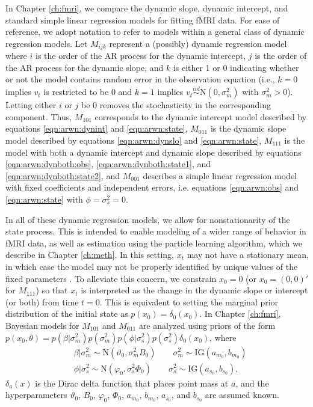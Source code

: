 In Chapter \ref{ch:fmri}, we compare the dynamic slope, dynamic intercept, and standard simple linear regression models for fitting fMRI data. For ease of reference, we adopt notation to refer to models within a general class of dynamic regression models. Let $M_{ijk}$ represent a (possibly) dynamic regression model where $i$ is the order of the AR process for the dynamic intercept, $j$ is the order of the AR process for the dynamic slope, and $k$ is either 1 or 0 indicating whether or not the model contains random error in the observation equation (i.e., $k = 0$ implies $v_t$ is restricted to be 0 and $k = 1$ implies $v_t \stackrel{iid}{\sim} \mbox{N}(0,\sigma^2_m)$ with $\sigma^2_m > 0$). Letting either $i$ or $j$ be 0 removes the stochasticity in the corresponding component. Thus, $M_{101}$ corresponds to the dynamic intercept model described by equations \ref{eqn:arwn:dynint} and \ref{eqn:arwn:state}, $M_{011}$ is the dynamic slope model described by equations \ref{eqn:arwn:dynslo} and \ref{eqn:arwn:state}, $M_{111}$ is the model with both a dynamic intercept and dynamic slope described by equations \ref{eqn:arwn:dynboth:obs}, \ref{eqn:arwn:dynboth:state1}, and \ref{eqn:arwn:dynboth:state2}, and $M_{001}$ describes a simple linear regression model with fixed coefficients and independent errors, i.e. equations \eqref{eqn:arwn:obs} and \eqref{eqn:arwn:state} with $\phi = \sigma^2_s = 0$.

In all of these dynamic regression models, we allow for nonstationarity of the state process. This is intended to enable modeling of a wider range of behavior in fMRI data, as well as estimation using the particle learning algorithm, which we describe in Chapter \ref{ch:meth}. In this setting, $x_t$ may not have a stationary mean, in which case the model may not be properly identified by unique values of the fixed parameters \citep{pagan:identify:1979}. To alleviate this concern, we constrain $x_0 = 0$ (or $x_0 = (0,0)'$ for $M_{111}$) so that $x_t$ is interpreted as the change in the dynamic slope or intercept (or both) from time $t = 0$. This is equivalent to setting the marginal prior distribution of the initial state as $p(x_0) = \delta_{0}(x_0)$. In Chapter \ref{ch:fmri}, Bayesian models for $M_{101}$ and $M_{011}$ are analyzed using priors of the form $p(x_0, \theta) = p(\beta|\sigma^2_m)p(\sigma^2_m)p(\phi|\sigma^2_s)p(\sigma^2_s)\delta_0(x_0)$, where
\begin{align}
&\beta|\sigma^2_m \sim \mbox{N}(\vartheta_0, \sigma^2_mB_0) \qquad \sigma^2_m \sim \mbox{IG}(a_{m_0}, b_{m_0}) \label{eqn:dynreg:prior1} \\
&\phi|\sigma^2_s \sim \mbox{N}(\varphi_0, \sigma^2_s\Phi_0) \qquad \sigma^2_s \sim \mbox{IG}(a_{s_0}, b_{s_0}), \label{eqn:dynreg:prior2}
\end{align}
$\delta_a(x)$ is the Dirac delta function that places point mass at $a$, and the hyperparameters $\vartheta_0$, $B_0$, $\varphi_0$, $\Phi_0$, $a_{m_0}$, $b_{m_0}$, $a_{s_0}$, and $b_{s_0}$ are assumed known.

